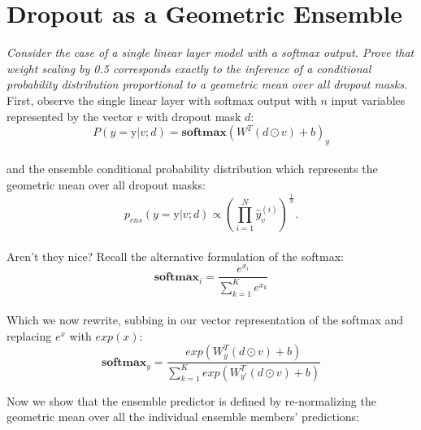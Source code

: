 \documentclass{amsart}
\theoremstyle{definition}
\theoremstyle{remark}
\numberwithin{equation}{section}
\begin{document}
\section{Dropout as a Geometric Ensemble}

\textit{Consider the case of a single linear layer model with a softmax output.
Prove that weight scaling by 0.5 corresponds exactly to the inference of a
conditional probability distribution proportional to a geometric mean over all
dropout masks.} \\

First, observe the single linear layer with softmax output with $n$ input
variables represented by the vector $v$ with dropout mask $d$: \\

\begin{equation}
P(y = \mbox{y} | v;d ) = \mathbf{softmax}\left( W^T(d \odot v) + b \right)_y
\end{equation} \\

and the ensemble conditional probability distribution which represents the
geometric mean over all dropout masks: \\

\begin{equation}
p_{ens}(y = \mbox{y} | v;d ) \propto \left( \prod_{i=1}^N \hat{y}_{v}^{(i)} \right)^{\frac{1}{N}}.
\end{equation} \\

Aren't they nice? Recall the alternative formulation of the softmax: \\

\begin{equation}
\mathbf{softmax}_i = \frac{e^{x_i}}{\sum_{k=1}^K e^{x_k}}
\end{equation} \\

Which we now rewrite, subbing in our vector representation of the softmax and
replacing $e^x$ with $exp(x)$: \\

\begin{equation}
\mathbf{softmax}_y = \frac{exp \left( W_y^T(d \odot v) + b \right)}
                          {\sum_{k=1}^K exp \left( W_{y'}^T(d \odot v) + b \right)}
\end{equation}

Now we show that the ensemble predictor is defined by re-normalizing the
geometric mean over all the individual ensemble members' predictions: \\
\end{document}
